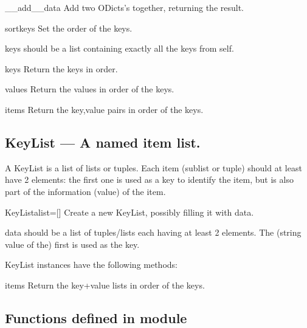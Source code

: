 \begin{funcdesc}{__add__}{data}
Add two ODicts's together, returning the result.
\end{funcdesc}

\begin{funcdesc}{sort}{keys}
Set the order of the keys.

        keys should be a list containing exactly all the keys from self.
        
\end{funcdesc}

\begin{funcdesc}{keys}{}
Return the keys in order.
\end{funcdesc}

\begin{funcdesc}{values}{}
Return the values in order of the keys.
\end{funcdesc}

\begin{funcdesc}{items}{}
Return the key,value pairs in order of the keys.
\end{funcdesc}

\subsection{KeyList --- A named item list.}
    A KeyList is a list of lists or tuples. Each item (sublist or tuple)
    should at least have 2 elements: the first one is used as a key to
    identify the item, but is also part of the information (value) of the
    item.
    

\begin{classdesc}{KeyList}{alist=[]}
Create a new KeyList, possibly filling it with data.

        data should be a list of tuples/lists each having at
        least 2 elements.
        The (string value of the) first is used as the key.
        
\end{classdesc}

KeyList instances have the following methods:

\begin{funcdesc}{items}{}
Return the key+value lists in order of the keys.
\end{funcdesc}

\subsection{Functions defined in module }

